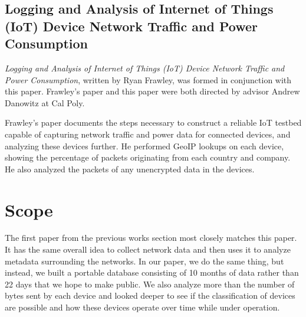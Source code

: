 
\subsection{Logging and Analysis of Internet of Things (IoT) Device Network Traffic and Power Consumption}
\label{frawleyPaper}
\textit{Logging and Analysis of Internet of Things (IoT) Device Network Traffic and Power Consumption}\cite{frawley_2018}, written by Ryan Frawley, was formed in conjunction with this paper. Frawley's paper and this paper were both directed by advisor Andrew Danowitz at Cal Poly.

Frawley's paper documents the steps necessary to construct a reliable IoT testbed capable of capturing network traffic and power data for connected devices, and analyzing these devices further. He performed GeoIP\cite{maxmind} lookups on each device, showing the percentage of packets originating from each country and company. He also analyzed the packets of any unencrypted data in the devices.

\section{Scope}
\label{Scope}
The first paper from the previous works section\cite{home_iot} most closely matches this paper. It has the same overall idea to collect network data and then uses it to analyze metadata surrounding the networks. In our paper, we do the same thing, but instead, we built a portable database consisting of 10 months of data rather than 22 days that we hope to make public. We also analyze more than the number of bytes sent by each device and looked deeper to see if the classification of devices are possible and how these devices operate over time while under operation.

